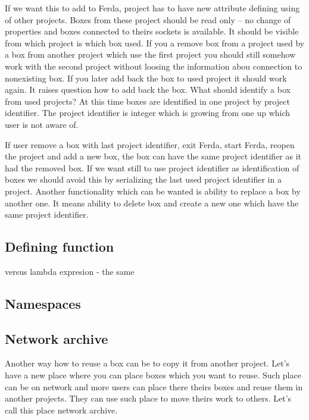 \documentclass{article}
\begin{document}
If we want this to add to Ferda, project has to have new attribute defining using of other projects. Boxes from these project should be read only -- no change of properties and boxes connected to theirs sockets is available. It should be visible from which project is which box used. If you a remove box from a project used by a box from another project which use the first project you should still somehow work with the second project without loosing the information abou connection to nonexisting box. If you later add back the box to used project it should work again. It raises question how to add back the box. What should identify a box from used projects? At this time boxes are identified in one project by project identifier. The project identifier is integer which is growing from one up which user is not aware of.

If user remove a box with last project identifier, exit Ferda, start Ferda, reopen the project and add a new box, the box can have the same project identifier as it had the removed box. If we want still to use project identifier as identification of boxes we should avoid this by serializing the last used project identifier in a project. Another functionality which can be wanted is ability to replace a box by another one. It means ability to delete box and create a new one which have the same project identifier.

\subsection{Defining function}
versus lambda expresion - the same
\subsection{Namespaces}
\subsection{Network archive}
Another way how to reuse a box can be to copy it from another project. Let's have a new place where you can place boxes which you want to reuse. Such place can be on network and more users can place there theirs boxes and reuse them in another projects. They can use such place to move theirs work to others. Let's call this place network archive.
\end{document}
